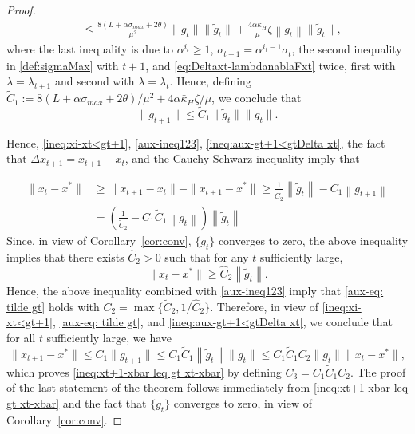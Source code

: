 \documentclass[10pt,a4paper]{amsart}
\begin{document}
\begin{proof}
\begin{align*}
&\leq \frac{8(L+\alpha\sigma_{max}+2\theta)}{\mu^2}\|g_t\|\|\tilde g_t\|+ \frac{4\alpha\bar \kappa_{H}}{\mu} \zeta\left\|g_t\right\|\|\tilde g_t\|,
\end{align*} 
where the last inequality is due to  $\alpha^{i_t}\geq 1$,  $\sigma_{t+1}=\alpha^{i_t-1}\sigma_t$,  the second inequality in \eqref{def:sigmaMax} with $t+1$, and \eqref{eq:Deltaxt-lambdanablaFxt} twice, first with $\lambda=\lambda_{t+1}$ and second with $\lambda=\lambda_t$.
Hence, defining $\tilde C_1:=8(L+\alpha \sigma_{max}+2\theta)/\mu^2+4\alpha\bar\kappa_H\zeta/\mu$, we conclude that 
\begin{equation}\label{ineq:aux-gt+1<gtDelta xt}
\|g_{t+1}\|\leq \tilde C_1\|\tilde g_t\|\|g_t\|.
\end{equation}

Hence, \eqref{ineq:xi-xt<gt+1},  \eqref{aux-ineq123}, \eqref{ineq:aux-gt+1<gtDelta xt}, the fact that $\Delta x_{t+1}=x_{t+1}-x_t$, and the Cauchy-Schwarz inequality imply that 

\begin{align}
 \|x_t-x^*\|&\geq \|x_{t+1}-x_t\|-\|x_{t+1}- x^*\| \geq \frac{1}{\tilde C_2} \left\|\tilde g_t\right\| - C_1 \left\|g_{t+1}\right\| \\
 &= \left(\frac{1}{\tilde C_2}  -C_1\tilde C_1 \left\| g_t\right\|\right)\left\|\tilde g_t\right\|
\end{align}
Since, in view of Corollary~\ref{cor:conv}, $\{g_t\}$ converges to zero,  the above inequality implies that there exists $\hat C_2>0$ such that for any $t$ sufficiently large,
$$
\|x_t- x^*\|\geq \hat C_2\left\|\tilde g_t\right\|.$$
Hence, the above inequality combined with \eqref{aux-ineq123} imply that  \eqref{aux-eq: tilde gt} holds with  $C_2=\max\{\tilde C_2, 1/\hat C_2\}$.
Therefore, in view of \eqref{ineq:xi-xt<gt+1}, \eqref{aux-eq: tilde gt}, and \eqref{ineq:aux-gt+1<gtDelta xt}, we conclude that for all $t$ sufficiently large, we have
$$
\|x_{t+1}-x^*\|\leq C_1\|g_{t+1}\|\leq C_1\tilde C_1\left\|\tilde g_t\right\|\|g_t\|\leq {C_1\tilde C_1C_2}\|g_t\|\|x_t-x^*\|,
$$
which proves \eqref{ineq:xt+1-xbar leq gt xt-xbar} by defining $C_3= C_1\tilde C_1 C_2$.
The proof of the last statement of the theorem follows immediately from \eqref{ineq:xt+1-xbar leq gt xt-xbar} and the fact that $\{g_t\}$ converges to zero, in view of Corollary~\ref{cor:conv}.
\end{proof}
\end{document}
